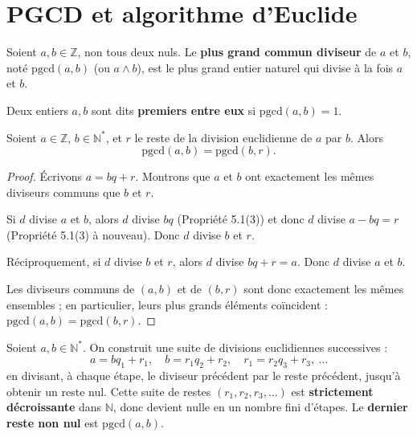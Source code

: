 \documentclass[a4paper,12pt,openany]{book}
\begin{document}
\section{PGCD et algorithme d'Euclide}


\begin{definition}[5.2]
Soient $a,b\in\mathbb{Z}$, non tous deux nuls. Le \textbf{plus grand
commun diviseur} de $a$ et $b$, noté $\mathrm{pgcd}(a,b)$ (ou $a\wedge b$),
est le plus grand entier naturel qui divise à la fois $a$ et $b$.
\end{definition}

\begin{definition}[5.3]
Deux entiers $a,b$ sont dits \textbf{premiers entre eux} si
$\mathrm{pgcd}(a,b)=1$.
\end{definition}

\begin{proposition}
Soient $a\in\mathbb{Z}$, $b\in\mathbb{N}^*$, et $r$ le reste de la
division euclidienne de $a$ par $b$. Alors
\[
\mathrm{pgcd}(a,b) = \mathrm{pgcd}(b,r).
\]
\end{proposition}

\begin{proof}
Écrivons $a=bq+r$. Montrons que $a$ et $b$ ont exactement les mêmes
diviseurs communs que $b$ et $r$.

Si $d$ divise $a$ et $b$, alors $d$ divise $bq$ (Propriété 5.1(3)) et donc
$d$ divise $a-bq=r$ (Propriété 5.1(3) à nouveau). Donc $d$ divise $b$ et
$r$.

Réciproquement, si $d$ divise $b$ et $r$, alors $d$ divise $bq+r=a$. Donc
$d$ divise $a$ et $b$.

Les diviseurs communs de $(a,b)$ et de $(b,r)$ sont donc exactement les
mêmes ensembles ; en particulier, leurs plus grands éléments coïncident :
$\mathrm{pgcd}(a,b)=\mathrm{pgcd}(b,r)$.
\end{proof}

\begin{theoreme}
Soient $a,b\in\mathbb{N}^*$. On construit une suite de divisions
euclidiennes successives :
\[
a = bq_1+r_1,\quad b=r_1q_2+r_2,\quad r_1=r_2q_3+r_3,\ \dots
\]
en divisant, à chaque étape, le diviseur précédent par le reste précédent,
jusqu'à obtenir un reste nul. Cette suite de restes $(r_1,r_2,r_3,\dots)$
est \textbf{strictement décroissante} dans $\mathbb{N}$, donc devient nulle
en un nombre fini d'étapes. Le \textbf{dernier reste non nul} est
$\mathrm{pgcd}(a,b)$.
\end{theoreme}
\end{document}
